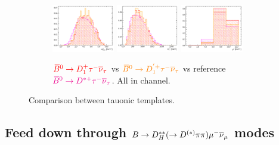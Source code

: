 \begin{figure}[!htb]
    \begin{subfigure}{\textwidth}
        \centering
        \includegraphics[width=0.3\textwidth]{figs-fit-fit-templates/histo-comp/Dst_iso_DstTau__vs__Dst_iso_D1ststTau__vs__Dst_iso_D1pststTau__m2miss.pdf}
        \includegraphics[width=0.3\textwidth]{figs-fit-fit-templates/histo-comp/Dst_iso_DstTau__vs__Dst_iso_D1ststTau__vs__Dst_iso_D1pststTau__el.pdf}
        \includegraphics[width=0.3\textwidth]{figs-fit-fit-templates/histo-comp/Dst_iso_DstTau__vs__Dst_iso_D1ststTau__vs__Dst_iso_D1pststTau__q2.pdf}
        \caption{
            $\textcolor{red}{{{\kern 0.18em\overline{\kern -0.18em B}}{}^0} \rightarrow {\ensuremath{D}}_1^+{\tau^-}{{\overline{\nu}}_\tau}}$
            vs
            $\textcolor{orange}{{{\kern 0.18em\overline{\kern -0.18em B}}{}^0} \rightarrow {\ensuremath{D}}_1^{'+} {\tau^-}{{\overline{\nu}}_\tau}}$
            vs reference
            $\textcolor{magenta}{{{\kern 0.18em\overline{\kern -0.18em B}}{}^0} \rightarrow {\ensuremath{{D}^{*+}}}{\ensuremath{\tau^-}}{\ensuremath{{\overline{\nu}}_\tau}}}$.
            All in \Dstar channel.
        }
    \end{subfigure}

    \caption{Comparison between tauonic \Dstst templates.}
    \label{fig:dstst-tau}
\end{figure}


\subsection{Feed down through $B \rightarrow D_H^{**}(\rightarrow D^{(*)}\pi\pi){\mu^-}{{\overline{\nu}}_\mu}$ modes}

